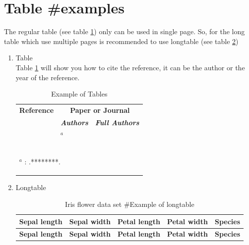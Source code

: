 \section{Table \#examples}
The regular table (see table \ref{tab:simpleTab}) only can be used in single page. So, for the long table which use multiple pages is recommended to use longtable (see table \ref{tab:fisher_irish})
\begin{enumerate}
	\item Table\\
	Table \ref{tab:simpleTab} will show you how to cite the reference, it can be the author or the year of the reference.
		\begin{table}[H]
		  \centering \caption{Example of Tables}
			\begin{tabular}{|p{1.5cm}|p{3.5cm}|p{3.5cm}|}
			\hline
			\multicolumn{1}{|c|}{\textbf{Reference}} & \multicolumn{2}{c|}{\textbf{Paper or Journal}} \\
			\cline{2-3}    \multicolumn{1}{|c|}{} & \multicolumn{1}{c|}{\textit{\textbf{Authors}}} & \multicolumn{1}{c|}{\textit{\textbf{Full Authors}}} \\
			\hline
			\cite{01_journal} & \citet{01_journal}$^a$ & \citefullauthor{01_journal} \\
			\hline
			\cite{02_journal} & \citet{02_journal} & \citefullauthor{02_journal} \\
			\hline
			\cite{03_journal} & \citet{03_journal} & \citefullauthor{03_journal} \\
			\hline
			\cite{04_journal} & \citet{04_journal} & \citefullauthor{04_journal} \\
			\hline
			\multicolumn{3}{l}{
				\begin{footnotesize}
					$^a$ : \citeyear{01_journal}.********.
				\end{footnotesize}
			} \\
			\end{tabular}%
		  \label{tab:simpleTab}%
		\end{table}%
	\item Longtable
		\begin{center}
			\begin{longtable}{|r|r|r|r|r|}\caption{Iris flower data set \#Example of longtable}\label{tab:fisher_irish}\\
				\hline
				\textbf{Sepal length} & \textbf{Sepal width} & \textbf{Petal length} & \textbf{Petal width} & \textbf{Species} \\
				\hline
				\endfirsthead
				\hline
				\textbf{Sepal length} & \textbf{Sepal width} & \textbf{Petal length} & \textbf{Petal width} & \textbf{Species} \\

\end{longtable}
\end{center}
\end{enumerate}

